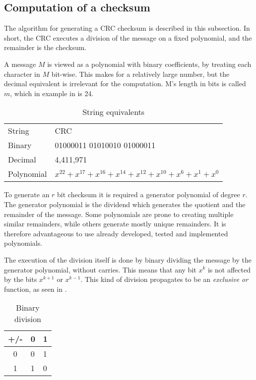 \subsection{Computation of a checksum}
The algorithm for generating a CRC checksum is described in this subsection.
In short, the CRC executes a division of the message on a fixed polynomial, and the remainder is the checksum. 

A message $M$ is viewed as a polynomial with binary coefficients, by treating each character in $M$ bit-wise. This makes for a relatively large number, but the decimal equivalent is irrelevant for the computation. M's length in bits is called $m$, which in example in  is 24.

\begin{table}[h!]
	\centering
	\begin{tabular}{ll}
		String  & CRC                        \\
		Binary  & 01000011 01010010 01000011 \\
		Decimal & 4,411,971                  \\
		Polynomial & $x^{22} + x^{17} + x^{16} + x^{14} + x^{12} + x^{10} + x^{6} + x^{1} + x^{0}$
	\end{tabular}
	\caption{String equivalents}
	\label{tab:string}
\end{table}

To generate an $r$ bit checksum it is required a generator polynomial of degree $r$. The generator polynomial is the dividend which generates the quotient and the remainder of the message. Some polynomials are prone to creating multiple similar remainders, while others generate mostly unique remainders. It is therefore advantageous to use already developed, tested and implemented polynomials.

The execution of the division itself is done by binary dividing the message by the generator polynomial, without carries. This means that any bit $x^k$ is not affected by the bits $x^{k+1}$ or $x^{k-1}$. This kind of division propagates to be an \textit{exclusive or} function, as seen in .

\begin{table}[h!]
	\centering
	\begin{tabular}{c|ll}
		+/- & 0 & 1 \\
		\hline
		0   & 0 & 1 \\
		1   & 1 & 0
	\end{tabular}
	\caption{Binary division}
	\label{binarydivision}
\end{table}





